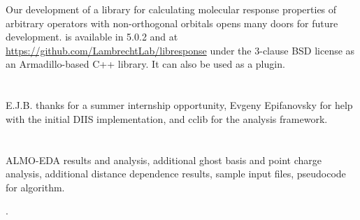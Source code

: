 Our development of a library for calculating molecular response properties of arbitrary operators with non-orthogonal orbitals opens many doors for future development. \libresponse{} is available in \qchem{} 5.0.2 and at \url{https://github.com/LambrechtLab/libresponse} under the 3-clause BSD license as an Armadillo-based\cite{armadillo} C++ library. It can also be used as a \psif{}\cite{Psi41.1} plugin.

\section{\texorpdfstring{}{Acknowledgements}}

E.J.B. thanks \qchem{} for a summer internship opportunity, Evgeny Epifanovsky for help with the initial DIIS implementation, and cclib\cite{OBoyle:2008cc,eric_berquist_2016_60670} for the analysis framework.

\section{\texorpdfstring{}{Supporting Information}}

ALMO-EDA results and analysis, additional ghost basis and point charge analysis, additional distance dependence results, sample input files, pseudocode for algorithm.

\begin{table}
  \centering
  \caption[ALMO-EDA results for argon\textemdash{}lithium cation dimer]{ALMO-EDA results. Energy units are \si{\kcal\per\mol}. All calculations used Hartree-Fock with a bond length of \SI{2.4297}{\angstrom}.}
  \label{tab:almo-eda-results}
  
\end{table}

\begin{table}
  \centering
  \caption{Analysis of ALMO-EDA terms from table~\ref{tab:almo-eda-results}.}.
  \label{tab:almo-eda-results-percentages}
  
\end{table}

\begin{table}
  \centering
  \caption[Point charge and ghost function polarizability analysis]{Percentage of supermolecular result for point charge and ghost function polarizabilities. All calculations used Hartree-Fock with canonical MOs and a distance of \SI{2.4297}{\angstrom} from argon to the other center(s).}
  \label{tab:basis-set-dependence-percentages}
  
\end{table}

